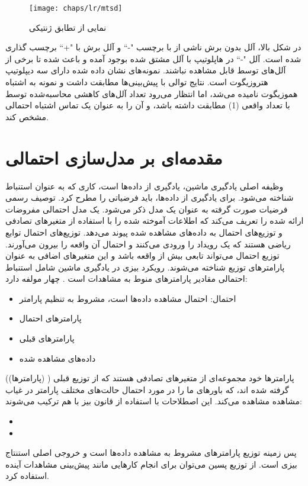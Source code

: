 \begin{figure}[!ht]
	\centerline{\texttt{[image: chaps/lr/mtsd]}}
	\caption{نمایی از تطابق ژنتیکی}
	\label{fig:ch_lr:mtsd}
\end{figure}

در شکل بالا، آلل  بدون برش ناشی از  با برچسب "-`` و آلل برش با "+`` برچسب گذاری شده است. آلل "-`` در هاپلوتیپ با آلل  مشتق شده بوجود آمده و باعث شده تا برخی از آلل‌های  توسط  قابل مشاهده نباشند. نمونه‌های نشان داده شده دارای سه دیپلوتیپ هتروزیگوت است. نتایج توالی با پیش‌بینی‌ها مطابقت داشت و نمونه  به اشتباه هموزیگوت نامیده می‌شد، اما انتظار می‌رود تعداد آلل‌های کاهشی محاسبه‌شده توسط  با تعداد واقعی (1) مطابقت داشته باشد، و آن را به عنوان یک تماس اشتباه احتمالی مشخص کند.

\section{مقدمه‌ای بر مدل‌سازی احتمالی }

وظیفه اصلی یادگیری ماشین، یادگیری از داده‌ها است، کاری که به عنوان استنباط شناخته می‌شود. برای یادگیری از داده‌ها، باید فرضیاتی را مطرح کرد. توصیف رسمی فرضیات صورت گرفته به عنوان یک مدل ذکر می‌شود. یک مدل احتمالی مفروضات ارائه شده را تعریف می‌کند که اطلاعات آموخته شده را با استفاده از متغیرهای تصادفی و توزیع‌های احتمال به داده‌های مشاهده شده پیوند می‌دهد. توزیع‌های احتمال توابع ریاضی هستند که یک رویداد را ورودی می‌کنند و احتمال آن واقعه را بیرون می‌آورند. توزیع احتمال می‌تواند تابعی بیش از واقعه باشد و این متغیرهای اضافی به عنوان پارامترهای توزیع شناخته می‌شوند\cite{hanahan2000hallmarks}. 
رویکرد بیزی در یادگیری ماشین شامل استنباط احتمالی مقادیر پارامترهای منوط به مشاهدات است \cite{hanahan2011hallmarks}. چهار مولفه دارد:

\begin{itemize}
	\item 	احتمال: احتمال مشاهده داده‌ها است، مشروط به تنظیم پارامتر  
	\item 	پارامترهای احتمال
	\item	پارامترهای قبلی 
	\item داده‌های مشاهده شده
\end{itemize}
پارامترها خود مجموعه‌ای از متغیرهای تصادفی هستند که از توزیع قبلی ( (پارامترها)) گرفته شده اند، که باورهای ما را در مورد احتمال حالت‌های مختلف پارامتر در غیاب مشاهده مشاهده می‌کند. این اصطلاحات با استفاده از قانون بیز با هم ترکیب می‌شوند:
\begin{itemize}
	\item {}
	\item {}
\end{itemize}
پس زمینه توزیع پارامترهای مشروط به مشاهده داده‌ها است و خروجی اصلی استنتاج بیزی است. از توزیع پسین می‌توان برای انجام کارهایی مانند پیش‌بینی مشاهدات آینده استفاده کرد.


